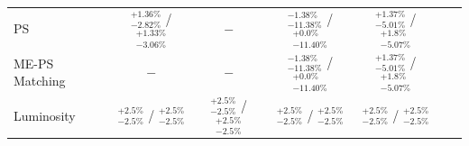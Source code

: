 \begin{table}[!htbp]
\begin{center}
{\begin{tabular}{lcccccc}
PS             &  $_{-2.82\%}^{+1.36\%}$ /  $_{-3.06\%}^{+1.33\%}$   & $-$  & $_{-11.38\%}^{-1.38\%}$ / $_{-11.40\%}^{+0.0\%}$  & $_{-5.01\%}^{+1.37\%}$ / $_{-5.07\%}^{+1.8\%}$  \\
ME-PS Matching             & $-$   & $-$  & $_{-11.38\%}^{-1.38\%}$ / $_{-11.40\%}^{+0.0\%}$  & $_{-5.01\%}^{+1.37\%}$ / $_{-5.07\%}^{+1.8\%}$  \\
Luminosity             &  $_{-2.5\%}^{+2.5\%}$ /  $_{-2.5\%}^{+2.5\%}$    & $_{-2.5\%}^{+2.5\%}$  / $_{-2.5\%}^{+2.5\%}$   & $_{-2.5\%}^{+2.5\%}$  / $_{-2.5\%}^{+2.5\%}$   & $_{-2.5\%}^{+2.5\%}$  / $_{-2.5\%}^{+2.5\%}$   \\    
\hline
\end{tabular}
}
\end{center}
\end{table}
